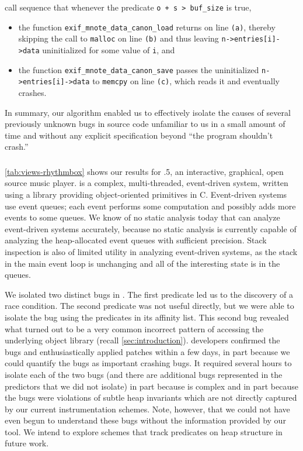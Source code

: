 call sequence that whenever the predicate \texttt{o + s > buf\_size} is true,
\begin{itemize}
\item the function \texttt{exif\_mnote\_data\_canon\_load} returns on
  line \texttt{(a)}, thereby skipping the call to \texttt{malloc} on
  line \texttt{(b)} and thus leaving \texttt{n->entries[i]->data}
  uninitialized for some value of \texttt{i}, and

\item the function \texttt{exif\_mnote\_data\_canon\_save} passes the
  uninitialized \texttt{n->entries[i]->data} to \texttt{memcpy} on line \texttt{(c)}, which reads it and eventually crashes.
\end{itemize}

In summary, our algorithm enabled us to effectively isolate the causes
of several previously unknown bugs in source code unfamiliar to us in
a small amount of time and without any explicit specification beyond
``the program shouldn't crash.''

\subsubsection{\rhythmbox}

\begingroup
\setlength{\segunit}{10pt}
\endgroup

\autoref{tab:views-rhythmbox} shows our results for .5,
an interactive, graphical, open source music player.  \rhythmbox is a
complex, multi-threaded, event-driven system, written using a library
providing object-oriented primitives in C.  Event-driven systems use
event queues; each event performs some computation and possibly adds
more events to some queues.  We know of no static analysis today that
can analyze event-driven systems accurately, because no static
analysis is currently capable of analyzing the heap-allocated event
queues with sufficient precision.  Stack inspection is also of
limited utility in analyzing event-driven systems, as the stack in the
main event loop is unchanging and all of the interesting state is in
the queues.

We isolated two distinct bugs in \rhythmbox.  The first predicate led
us to the discovery of a race condition.  The second predicate was not
useful directly, but we were able to isolate the bug using the
predicates in its affinity list.  This second bug revealed what turned
out to be a very common incorrect pattern of accessing the underlying
object library (recall \autoref{sec:introduction}).  \rhythmbox
developers confirmed the bugs and enthusiastically applied patches
within a few days, in part because we could quantify the bugs as
important crashing bugs.  It required several hours to isolate each of
the two bugs (and there are additional bugs represented in the
predictors that we did not isolate) in part because \rhythmbox is
complex and in part because the bugs were violations of subtle heap
invariants which are not directly captured by our current
instrumentation schemes.  Note, however, that we could not have even
begun to understand these bugs without the information provided by our
tool.  We intend to explore schemes that track predicates on heap
structure in future work.

